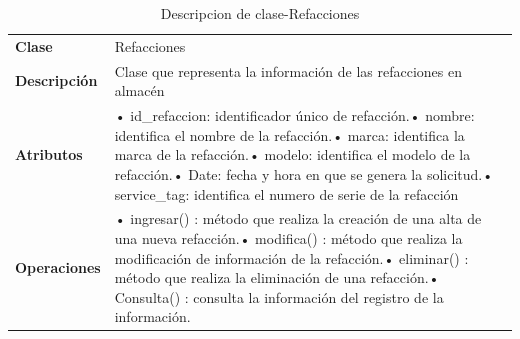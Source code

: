 \begin{table}[H]
	\centering
	\caption{Descripcion de clase-Refacciones}
	\begin{tabular}{|p{6.145em}|p{28.07em}|}
		\toprule
		\rowcolor[rgb]{ .125,  .216,  .392} \multicolumn{2}{|p{34.215em}|}{\textcolor[rgb]{ 1,  1,  1}{\textbf{Clase Refacciones}}} \\
		\midrule
		\textbf{Clase} & \multicolumn{1}{l|}{Refacciones} \\
		\midrule
		\textbf{Descripción} & Clase que representa la información de las refacciones en almacén  \\
		\midrule
		\textbf{Atributos } & •	id\_refaccion: identificador único de refacción.\newline{}•	nombre: identifica el nombre de la refacción.\newline{}•	marca: identifica la marca de la refacción.\newline{}•	modelo: identifica el modelo de la refacción.\newline{}•	Date: fecha y hora en que se genera la solicitud.\newline{}•	service\_tag: identifica el numero de serie de la refacción \\
		\midrule
		\textbf{Operaciones} & •	ingresar() :  método que realiza la creación de una alta de una nueva refacción.\newline{}•	modifica() : método que  realiza la modificación de información de la refacción.\newline{}•	eliminar() : método que realiza la eliminación de una refacción.\newline{}•	Consulta() : consulta la información del registro de la información. \\
		\bottomrule
	\end{tabular}%
	\label{tab:class14}%
\end{table}%


